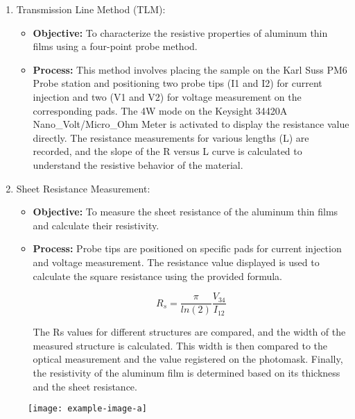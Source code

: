 \begin{enumerate}
    \item Transmission Line Method (TLM):
    \begin{itemize}
        \item \textbf{Objective:} To characterize the resistive properties of aluminum thin films using a four-point probe method.
        \item \textbf{Process:} This method involves placing the sample on the Karl Suss PM6 Probe station and positioning two probe tips (I1 and I2) for current injection and two (V1 and V2) for voltage measurement on the corresponding pads. The 4W mode on the Keysight 34420A Nano\_Volt/Micro\_Ohm Meter is activated to display the resistance value directly. The resistance measurements for various lengths (L) are recorded, and the slope of the R versus L curve is calculated to understand the resistive behavior of the material.
    \end{itemize}
    
    \item Sheet Resistance Measurement:
    \begin{itemize}
        \item \textbf{Objective:} To measure the sheet resistance of the aluminum thin films and calculate their resistivity.
        \item \textbf{Process:} Probe tips are positioned on specific pads for current injection and voltage measurement. The resistance value displayed is used to calculate the square resistance using the provided formula. 
        
        \[R_s = \frac{\pi}{ln(2)} \frac{V_{34}}{I_{12}}\]
        
        The Rs values for different structures are compared, and the width of the measured structure is calculated. This width is then compared to the optical measurement and the value registered on the photomask. Finally, the resistivity of the aluminum film is determined based on its thickness and the sheet resistance.
    \end{itemize}
\end{enumerate}


\begin{figure}[h]
\centering
\begin{minipage}{0.35\textwidth}         %
  \centering
  \texttt{[image: example-image-a]}
\end{minipage}
\end{figure}






